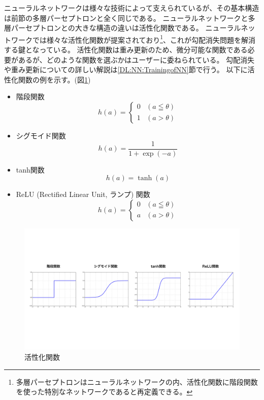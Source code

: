 ニューラルネットワークは様々な技術によって支えられているが、その基本構造は前節の多層パーセプトロンと全く同じである。
ニューラルネットワークと多層パーセプトロンとの大きな構造の違いは活性化関数である。
ニューラルネットワークでは様々な活性化関数が提案されており\footnote{多層パーセプトロンはニューラルネットワークの内、活性化関数に階段関数を使った特別なネットワークであると再定義できる。}、これが勾配消失問題を解消する鍵となっている。
活性化関数は重み更新のため、微分可能な関数である必要があるが、どのような関数を選ぶかはユーザーに委ねられている。
勾配消失や重み更新についての詳しい解説は\ref{DL:NN:TrainingofNN}節で行う。
以下に活性化関数の例を示す。(図\ref{5ActivationFunction})
\begin{itemize}
  \item 階段関数
\begin{equation}
 h(a) = \left\{ \begin{array}{ll}
    0 & (a \leqq \theta) \\
    1 & (a > \theta)
 \end{array} \right.
\end{equation}
  \item シグモイド関数
\begin{equation}
 h(a) = \frac{1}{1+\exp{(-a)}}
\end{equation}
  \item tanh関数
\begin{equation}
 h(a) = \tanh{(a)}
\end{equation}
  \item ReLU (Rectified Linear Unit, ランプ) 関数
\begin{equation}
 h(a) = \left\{ \begin{array}{ll}
    0 & (a \leqq \theta) \\
    a & (a > \theta)
 \end{array} \right.
\end{equation}
\end{itemize}

\begin{figure}[h]
 \centering
 \includegraphics[trim = 0 200 0 200, width=1.0\textwidth, clip]{Figure/2DeepLearning/5ActivationFunction.png}
 \caption{活性化関数}
 \label{5ActivationFunction}
\end{figure}


